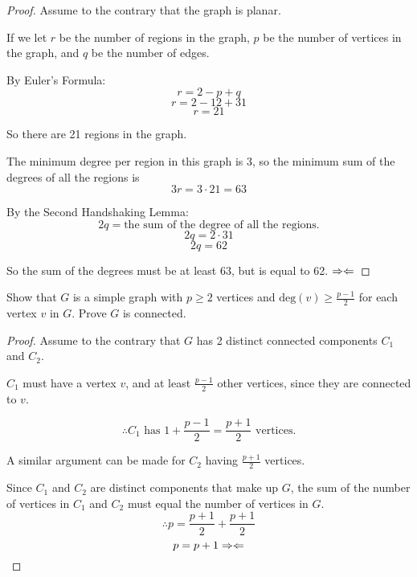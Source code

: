 \documentclass[12pt]{article}
\begin{document}
\begin{proof}
Assume to the contrary that the graph is planar.

If we let $r$ be the number of regions in the graph, $p$ be the number of vertices in the graph, and $q$ be the number of edges.

By Euler's Formula:
$$r = 2 - p + q$$
$$r = 2 - 12 + 31$$
$$r = 21$$

So there are 21 regions in the graph.

The minimum degree per region in this graph is 3, so the minimum sum of the degrees of all the regions is
$$3r = 3 \cdot 21 = 63$$

By the Second Handshaking Lemma:
$$2q = \text{the sum of the degree of all the regions.}$$
$$2q = 2 \cdot 31$$
$$2q = 62$$

So the sum of the degrees must be at least 63, but is equal to 62. $\Rightarrow\Leftarrow$

\end{proof}
\newpage
\begin{flushleft}
Show that $G$ is a simple graph with $p \geq 2$ vertices and $\text{deg}(v)\geq\frac{p - 1}{2}$ for each vertex $v$ in $G$. Prove $G$ is connected.
\end{flushleft}

\begin{proof}
Assume to the contrary that $G$ has 2 distinct connected components $C_1$ and $C_2$.

$C_1$ must have a vertex $v$, and at least $\frac{p-1}{2}$ other vertices, since they are connected to $v$. 

$$\therefore C_1 \text{ has } 1 + \frac{p-1}{2} = \frac{p+1}{2} \text{ vertices.}$$

A similar argument can be made for $C_2$ having $\frac{p+1}{2}$ vertices.

Since $C_1$ and $C_2$ are distinct components that make up $G$, the sum of the number of vertices in $C_1$ and $C_2$ must equal the number of vertices in $G$.
$$\therefore p = \frac{p+1}{2} + \frac{p + 1}{2}$$
$$p = p + 1 \Rightarrow\Leftarrow$$

\end{proof}
\end{document}
